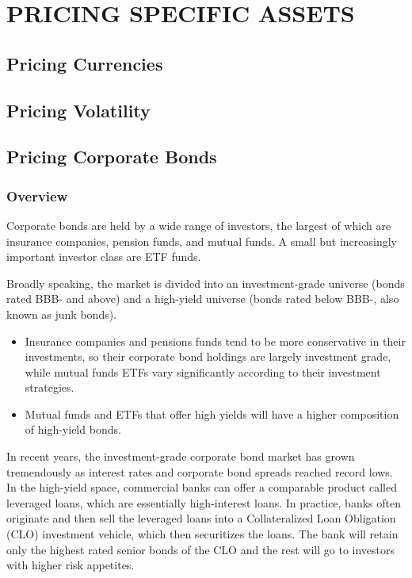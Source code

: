 \documentclass[
]{book}
\providecommand{\tightlist}{%
  \setlength{\itemsep}{0pt}\setlength{\parskip}{0pt}}
\begin{document}
\hypertarget{part-pricing-specific-assets}{%
\part*{PRICING SPECIFIC ASSETS}\label{part-pricing-specific-assets}}

\hypertarget{pricing-currencies}{%
\chapter{Pricing Currencies}\label{pricing-currencies}}

\hypertarget{pricing-volatility}{%
\chapter{Pricing Volatility}\label{pricing-volatility}}

\hypertarget{pricing-corporate-bonds}{%
\chapter{Pricing Corporate Bonds}\label{pricing-corporate-bonds}}

\hypertarget{overview}{%
\section{Overview}\label{overview}}

Corporate bonds are held by a wide range of investors, the largest of which are insurance companies, pension funds, and mutual funds. A small but increasingly important investor class are ETF funds.

Broadly speaking, the market is divided into an investment-grade universe (bonds rated BBB- and above) and a high-yield universe (bonds rated below BBB-, also known as junk bonds).

\begin{itemize}
\tightlist
\item
  Insurance companies and pensions funds tend to be more conservative in their investments, so their corporate bond holdings are largely investment grade, while mutual funds ETFs vary significantly according to their investment strategies.
\item
  Mutual funds and ETFs that offer high yields will have a higher composition of high-yield bonds.
\end{itemize}

In recent years, the investment-grade corporate bond market has grown tremendously as interest rates and corporate bond spreads reached record lows. In the high-yield space, commercial banks can offer a comparable product called leveraged loans, which are essentially high-interest loans. In practice, banks often originate and then sell the leveraged loans into a Collateralized Loan Obligation (CLO) investment vehicle, which then securitizes the loans. The bank will retain only the highest rated senior bonds of the CLO and the rest will go to investors with higher risk appetites.
\end{document}
